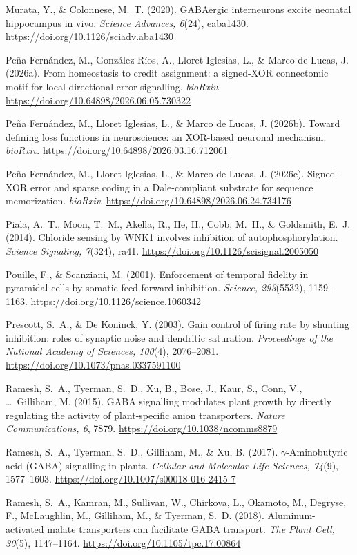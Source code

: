 \documentclass[11pt,a4paper]{article}
\newenvironment{apabib}{\raggedright\begin{list}{}{%
  \setlength{\leftmargin}{1.6em}\setlength{\itemindent}{-1.6em}%
  \setlength{\itemsep}{3pt}\setlength{\parsep}{0pt}\setlength{\topsep}{4pt}}}%
  {\end{list}}
\begin{document}
\begin{apabib}
\item Murata, Y., \& Colonnese, M.~T. (2020). GABAergic interneurons excite neonatal hippocampus in vivo. \emph{Science Advances, 6}(24), eaba1430. \url{https://doi.org/10.1126/sciadv.aba1430}
\item Pe\~na Fern\'andez, M., Gonz\'alez R\'ios, A., Lloret Iglesias, L., \& Marco de Lucas, J. (2026a). From homeostasis to credit assignment: a signed-XOR connectomic motif for local directional error signalling. \emph{bioRxiv}. \url{https://doi.org/10.64898/2026.06.05.730322}
\item Pe\~na Fern\'andez, M., Lloret Iglesias, L., \& Marco de Lucas, J. (2026b). Toward defining loss functions in neuroscience: an XOR-based neuronal mechanism. \emph{bioRxiv}. \url{https://doi.org/10.64898/2026.03.16.712061}
\item Pe\~na Fern\'andez, M., Lloret Iglesias, L., \& Marco de Lucas, J. (2026c). Signed-XOR error and sparse coding in a Dale-compliant substrate for sequence memorization. \emph{bioRxiv}. \url{https://doi.org/10.64898/2026.06.24.734176}
\item Piala, A.~T., Moon, T.~M., Akella, R., He, H., Cobb, M.~H., \& Goldsmith, E.~J. (2014). Chloride sensing by WNK1 involves inhibition of autophosphorylation. \emph{Science Signaling, 7}(324), ra41. \url{https://doi.org/10.1126/scisignal.2005050}
\item Pouille, F., \& Scanziani, M. (2001). Enforcement of temporal fidelity in pyramidal cells by somatic feed-forward inhibition. \emph{Science, 293}(5532), 1159--1163. \url{https://doi.org/10.1126/science.1060342}
\item Prescott, S.~A., \& De Koninck, Y. (2003). Gain control of firing rate by shunting inhibition: roles of synaptic noise and dendritic saturation. \emph{Proceedings of the National Academy of Sciences, 100}(4), 2076--2081. \url{https://doi.org/10.1073/pnas.0337591100}
\item Ramesh, S.~A., Tyerman, S.~D., Xu, B., Bose, J., Kaur, S., Conn, V., \ldots\ Gilliham, M. (2015). GABA signalling modulates plant growth by directly regulating the activity of plant-specific anion transporters. \emph{Nature Communications, 6}, 7879. \url{https://doi.org/10.1038/ncomms8879}
\item Ramesh, S.~A., Tyerman, S.~D., Gilliham, M., \& Xu, B. (2017). $\gamma$-Aminobutyric acid (GABA) signalling in plants. \emph{Cellular and Molecular Life Sciences, 74}(9), 1577--1603. \url{https://doi.org/10.1007/s00018-016-2415-7}
\item Ramesh, S.~A., Kamran, M., Sullivan, W., Chirkova, L., Okamoto, M., Degryse, F., McLaughlin, M., Gilliham, M., \& Tyerman, S.~D. (2018). Aluminum-activated malate transporters can facilitate GABA transport. \emph{The Plant Cell, 30}(5), 1147--1164. \url{https://doi.org/10.1105/tpc.17.00864}

\end{apabib}
\end{document}
